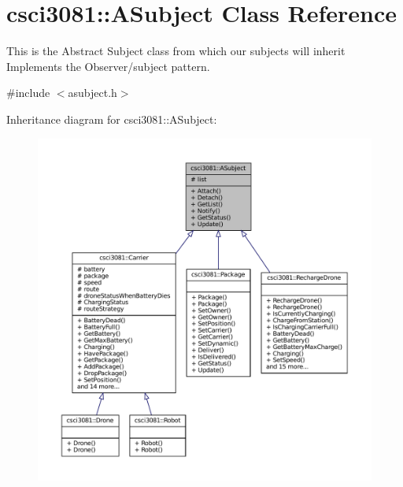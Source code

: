 \hypertarget{classcsci3081_1_1ASubject}{}\section{csci3081\+:\+:A\+Subject Class Reference}
\label{classcsci3081_1_1ASubject}


This is the Abstract Subject class from which our subjects will inherit Implements the Observer/subject pattern.  




{\ttfamily \#include $<$asubject.\+h$>$}



Inheritance diagram for csci3081\+:\+:A\+Subject\+:
\nopagebreak
\begin{figure}[H]
\begin{center}
\leavevmode
\includegraphics[width=350pt]{classcsci3081_1_1ASubject__inherit__graph}
\end{center}
\end{figure}
